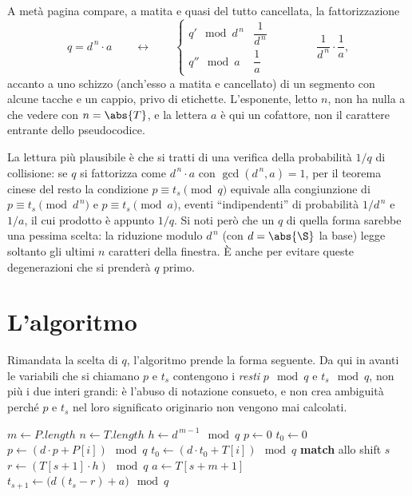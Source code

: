 \begin{dubbio}
A metà pagina compare, a matita e quasi del tutto cancellata, la fattorizzazione
\[
  q = d^{\,n}\cdot a
  \qquad\longleftrightarrow\qquad
  \begin{cases}
    q' \mod d^{\,n} & \dfrac{1}{d^{\,n}}\\[2ex]
    q'' \mod a      & \dfrac{1}{a}
  \end{cases}
  \qquad\qquad \frac{1}{d^{\,n}}\cdot\frac{1}{a},
\]
accanto a uno schizzo (anch'esso a matita e cancellato) di un segmento con alcune tacche e un
cappio, privo di etichette. L'esponente, letto $n$, non ha nulla a che vedere con
$n = \abs{T}$, e la lettera $a$ è qui un cofattore, non il carattere entrante dello
pseudocodice.

La lettura più plausibile è che si tratti di una verifica della probabilità $1/q$ di
collisione: se $q$ si fattorizza come $d^{\,n}\cdot a$ con $\gcd(d^{\,n},a)=1$, per il
teorema cinese del resto la condizione $p \equiv t_s \pmod q$ equivale alla congiunzione di
$p \equiv t_s \pmod{d^{\,n}}$ e $p \equiv t_s \pmod a$, eventi ``indipendenti'' di
probabilità $1/d^{\,n}$ e $1/a$, il cui prodotto è appunto $1/q$. Si noti però che un $q$ di
quella forma sarebbe una pessima scelta: la riduzione modulo $d^{\,n}$ (con $d = \abs{\S}$ la
base) legge soltanto gli ultimi $n$ caratteri della finestra. È anche per evitare queste
degenerazioni che si prenderà $q$ primo.
\end{dubbio}

\section{L'algoritmo}

Rimandata la scelta di $q$, l'algoritmo prende la forma seguente. Da qui in avanti le
variabili che si chiamano $p$ e $t_s$ contengono i \emph{resti} $p \mod q$ e $t_s \mod q$,
non più i due interi grandi: è l'abuso di notazione consueto, e non crea ambiguità perché
$p$ e $t_s$ nel loro significato originario non vengono mai calcolati.

\begin{algorithm}[H]
\caption{\textsc{Karp--Rabin}$(T,P,d,q)$}
\label{alg:karp-rabin}
\begin{algorithmic}[1]
  \State $m \gets P.\mathit{length}$
  \State $n \gets T.\mathit{length}$
  \State $h \gets d^{\,m-1} \mod q$
  \State $p \gets 0$
  \State $t_0 \gets 0$
   
    \State $p   \gets (d\cdot p   + P[i]) \mod q$
    \State $t_0 \gets (d\cdot t_0 + T[i]) \mod q$
  \EndFor
     
       
        \State \textbf{match} allo shift $s$
      \EndIf
    \EndIf
     
      \State $r \gets (T[s+1]\cdot h) \mod q$
      \State $a \gets T[s+m+1]$
      \State $t_{s+1} \gets \bigl(d\,(t_s - r) + a\bigr) \mod q$
    \EndIf
  \EndFor
\end{algorithmic}
\end{algorithm}

